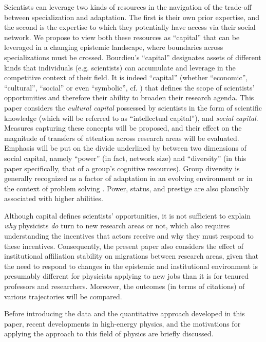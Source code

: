 \documentclass{article}
\begin{document}
Scientists can leverage two kinds of resources in the navigation of the trade-off between specialization and adaptation. The first is their own prior expertise, and the second is the expertise to which they potentially have access via their social network. We propose to view both these resources as ``capital'' \citep{Bourdieu1986} that can be leveraged in a changing epistemic landscape, where boundaries across specializations must be crossed. Bourdieu's ``capital'' designates assets of different kinds that individuals (e.g. scientists) can accumulate and leverage in the competitive context of their field. It is indeed ``capital''  (whether ``economic'', ``cultural'', ``social'' or even ``symbolic'', cf. \citealt{Bourdieu1986}) that defines the scope of scientists' opportunities and therefore their ability to broaden their research agenda. This paper considers the \textit{cultural capital} possessed by scientists in the form of scientific knowledge (which will be referred to as ``intellectual capital''), and \textit{social capital}. Measures capturing these concepts will be proposed, and their effect on the magnitude of transfers of attention across research areas will be evaluated. Emphasis will be put on the divide underlined by \citet{Abbasi2014} between two dimensions of social capital, namely ``power'' (in fact, network size) and ``diversity'' (in this paper specifically, that of a group's cognitive resources). Group diversity is generally recognized as a factor of adaptation in an evolving environment \citep{Schimmelpfennig2021,Muthukrishna2016,Henrich2004} or in the context of problem solving \citep{Hong2004}. Power, status, and prestige are also plausibly associated with higher abilities.

Although capital defines scientists' opportunities, it is not sufficient to explain \textit{why} physicists \textit{do} turn to new research areas or not, which also requires understanding the incentives that actors receive and why they must respond to these incentives. Consequently, the present paper also considers the effect of institutional affiliation stability on migrations between research areas, given that the need to respond to changes in the epistemic and institutional environment is presumably different for physicists applying to new jobs than it is for tenured professors and researchers. Moreover, the outcomes (in terms of citations) of various trajectories will be compared.

Before introducing the data and the quantitative approach developed in this paper, recent developments in high-energy physics, and the motivations for applying the approach to this field of physics are briefly discussed. 
\end{document}
